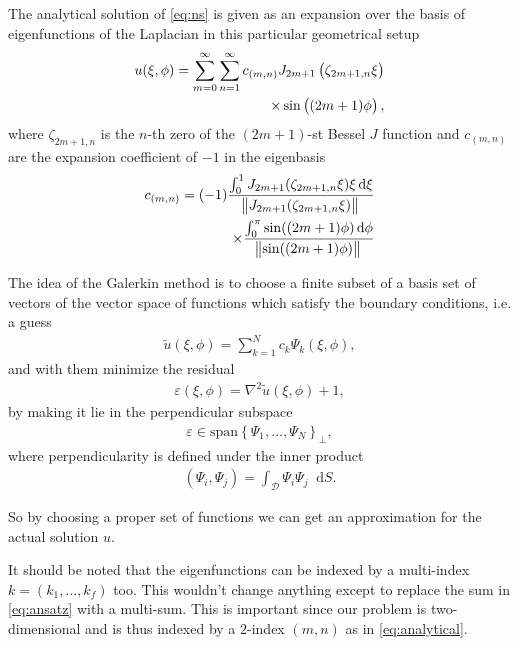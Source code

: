 \documentclass[10pt,a4paper,twocolumn]{article}
\newcommand{\diff}{\mathop{}\!\mathrm{d}}
\begin{document}
The analytical solution of \cref{eq:ns} is given as an expansion over the basis of eigenfunctions of the Laplacian in this particular geometrical setup
%
\begin{align}\label{eq:analytical}
    u(\xi, \phi) = \sum_{m = 0}^{\infty} \sum_{n = 1}^{\infty} c_{(m,n)} J_{2 m + 1} \left(\zeta_{2 m + 1, n} \xi \right)\notag\\
    \times \sin \left( (2 m + 1) \phi \right),
\end{align}
%
where $\zeta_{2 m + 1, n}$ is the $n$-th zero of the $(2 m + 1)$-st Bessel $J$ function and $c_{(m,n)}$ are the expansion coefficient of $-1$ in the eigenbasis
%
\begin{align}
    c_{(m,n)} = (-1) \frac{\int_{0}^{1} J_{2 m + 1}(\zeta_{2 m + 1, n} \xi) \xi \diff \xi }{\norm{J_{2 m + 1}(\zeta_{2 m + 1, n} \xi)}} \notag\\
    \times \frac{\int_{0}^{\pi} \sin((2 m + 1) \phi) \diff \phi}{\norm{\sin((2 m + 1) \phi)}}
\end{align}

The idea of the Galerkin method \cite{ucilnica} is to choose a finite subset of a basis set of vectors of the vector space of functions which satisfy the boundary conditions, i.e. a guess
%
\begin{align}\label{eq:ansatz}
    \tilde{u}(\xi, \phi) = \sum_{k=1}^{N} c_k \Psi_k (\xi, \phi),
\end{align}
%
and with them minimize the residual
%
\begin{align}\label{eq:resid}
    \varepsilon(\xi, \phi) = \nabla^2 \tilde{u}(\xi, \phi) + 1,
\end{align}
%
by making it lie in the perpendicular subspace
%
\begin{align}\label{eq:cond}
    \varepsilon \in \mathrm{span}\left\lbrace \Psi_1, \dots, \Psi_N \right\rbrace_{\perp},
\end{align}
%
where perpendicularity is defined under the inner product
%
\begin{align}
    (\Psi_i, \Psi_j) = \int_{\mathcal{D}} \Psi_i \Psi_j \diff S.
\end{align}

So by choosing a proper set of functions we can get an approximation for the actual solution $u$. 

It should be noted that the eigenfunctions can be indexed by a multi-index $k = (k_1, \dots, k_f)$ too. This wouldn't change anything except to replace the sum in \cref{eq:ansatz} with a multi-sum. This is important since our problem is two-dimensional and is thus indexed by a $2$-index $(m, n)$ as in \cref{eq:analytical}.
\end{document}

